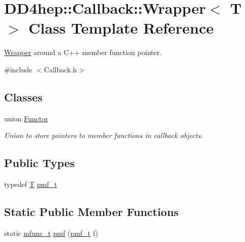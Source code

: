 \hypertarget{class_d_d4hep_1_1_callback_1_1_wrapper}{}\section{D\+D4hep\+:\+:Callback\+:\+:Wrapper$<$ T $>$ Class Template Reference}
\label{class_d_d4hep_1_1_callback_1_1_wrapper}


\hyperlink{class_d_d4hep_1_1_callback_1_1_wrapper}{Wrapper} around a C++ member function pointer.  




{\ttfamily \#include $<$Callback.\+h$>$}

\subsection*{Classes}
\begin{DoxyCompactItemize}
\item 
union \hyperlink{union_d_d4hep_1_1_callback_1_1_wrapper_1_1_functor}{Functor}
\begin{DoxyCompactList}\small\item\em Union to store pointers to member functions in callback objects. \end{DoxyCompactList}\end{DoxyCompactItemize}
\subsection*{Public Types}
\begin{DoxyCompactItemize}
\item 
typedef \hyperlink{class_t}{T} \hyperlink{class_d_d4hep_1_1_callback_1_1_wrapper_ab266379df9f395d1221b2adbf62b112c}{pmf\+\_\+t}
\end{DoxyCompactItemize}
\subsection*{Static Public Member Functions}
\begin{DoxyCompactItemize}
\item 
static \hyperlink{struct_d_d4hep_1_1_callback_1_1mfunc__t}{mfunc\+\_\+t} \hyperlink{class_d_d4hep_1_1_callback_1_1_wrapper_a99e377622ec6bc663c3165a504b5011b}{pmf} (\hyperlink{class_d_d4hep_1_1_callback_1_1_wrapper_ab266379df9f395d1221b2adbf62b112c}{pmf\+\_\+t} f)
\end{DoxyCompactItemize}


